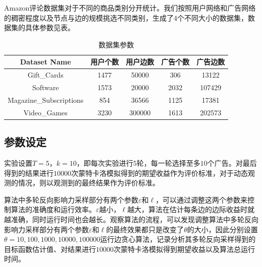 Amazon评论数据集对于不同的商品类别分开统计。我们按照用户网络和广告网络的稠密程度以及节点与边的规模挑选不同类别，生成了4个不同大小的数据集，数据集的具体参数见表\label{tab:imdata}。

\begin{table}[htbp]
	\setlength{\tabcolsep}{2mm}{}
	\centering
	\normalsize
	\caption{数据集参数}\label{tab:imdata}
	\begin{tabular}[t]{|c|c|c|c|c|}
        \hline
		Dataset Name & 用户个数 & 用户边数 & 广告个数 & 广告边数 \\ \hline
		Gift\_Cards & 1477 & 50000 & 306 & 13122 \\ \hline
		Software & 1573 & 20000 & 2032 & 107429 \\ \hline
		Magazine\_Subscriptions & 854 & 36566 & 1125 & 17381 \\ \hline
		Video\_Games & 3230 & 300000 & 1613 & 202573 \\ \hline
	\end{tabular}	
\end{table}

\subsection{参数设定}

实验设置$T=5$，$k=10$，即每次实验进行$5$轮，每一轮选择至多$10$个广告。对最后得到的结果进行$10000$次蒙特卡洛模拟得到的期望收益作为评价标准，对于动态观测的情况，则以观测到的最终结果作为评价标准。

算法中多轮反向影响力采样部分有两个参数$\varepsilon$和$\ell$，可以通过调整这两个参数来控制算法的准确度和运行效率。$\varepsilon$越小，$\ell$越大，算法在估计每条边的边际收益时就越准确，同时运行时间也会越长。观察算法的流程，可以发现调整算法中多轮反向影响力采样部分有两个参数$\varepsilon$和$\ell$的最终效果都只是改变了$\theta$的大小，因此分别设置$\theta=10,100,1000,10000,100000$运行边贪心算法，记录分析其多轮反向采样得到的目标函数估计值、对结果进行$10000$次蒙特卡洛模拟得到期望收益以及算法总运行时间。

